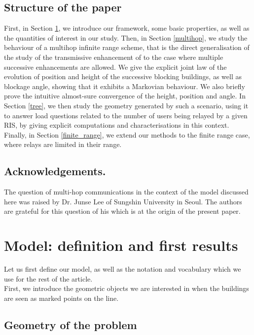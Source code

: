 \documentclass[10pt,english,a4paper]{smfart}
\theoremstyle{definition}
\theoremstyle{remark}
\begin{document}
\subsection*{Structure of the paper}

First, in Section \ref{model}, we introduce our framework, some basic properties, as well as the quantities of interest in our study. Then, in Section \ref{multihop}, we study the behaviour of a multihop infinite range scheme, that is the direct generalisation of the study of the transmissive enhancement of \cite{Junse_Francois} to the case where multiple successive enhancements are allowed. We give the explicit joint law of the evolution of position and height of the successive blocking buildings, as well as blockage angle, showing that it exhibits a Markovian behaviour. We also briefly prove the intuitive almost-sure convergence of the height, position and angle. In Section \ref{tree}, we then study the geometry generated by such a scenario, using it to answer load questions related to the number of users being relayed by a given RIS, by giving explicit computations and characterisations in this context. Finally, in Section \ref{finite_range}, we extend our methods to the finite range case, where relays are limited in their range.

\subsection*{Acknowledgements.}

The question of multi-hop communications in the context of the model discussed here was raised by Dr. Junse Lee of Sungshin University in Seoul. The authors are grateful for this question of his which is at the origin of the present paper.

\section{Model: definition and first results}\label{model}

Let us first define our model, as well as the notation and vocabulary which we use for the rest of the article.\\
First, we introduce the geometric objects we are interested in when the buildings are seen as marked points on the line.

\subsection{Geometry of the problem}
\end{document}
